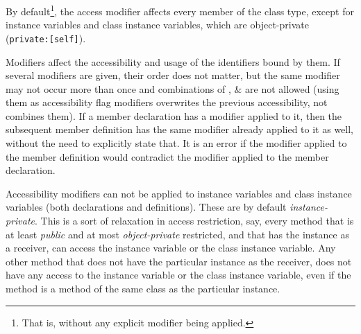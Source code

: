 By default\footnote{That is, without any explicit modifier being applied.}, the  access modifier affects every member of the class type, except for instance variables and class instance variables, which are object-private (\lstinline!private:[self]!). 

Modifiers affect the accessibility and usage of the identifiers bound by them. If several modifiers are given, their order does not matter, but the same modifier may not occur more than once and combinations of ,  \&  are not allowed (using them as accessibility flag modifiers overwrites the previous accessibility, not combines them). If a member declaration has a modifier applied to it, then the subsequent member definition has the same modifier already applied to it as well, without the need to explicitly state that. It is an error if the modifier applied to the member definition would contradict the modifier applied to the member declaration. 

Accessibility modifiers can not be applied to instance variables and class instance variables (both declarations and definitions). These are by default {\em instance-private}. This is a sort of relaxation in access restriction, say, every method that is at least {\em public} and at most {\em object-private} restricted, and that has the instance as a receiver, can access the instance variable or the class instance variable. Any other method that does not have the particular instance as the receiver, does not have any access to the instance variable or the class instance variable, even if the method is a method of the same class as the particular instance. 

